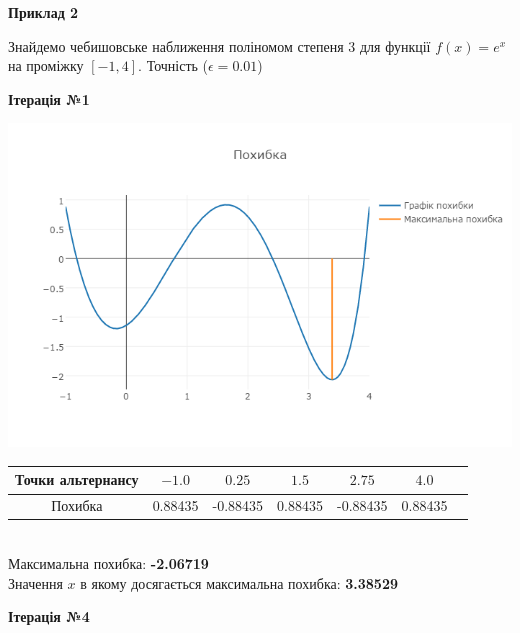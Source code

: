 \documentclass[ukrainian,14pt]{extarticle}
\begin{document}
\newpage


\textbf{Приклад 2} 	

Знайдемо чебишовське наближення поліномом степеня 3 для функції $f(x) = e^{x}$ на проміжку $[-1, 4]$. Точність ($\epsilon = 0.01$)

\begin{center}
\textbf{Ітерація №1}
\end{center}

\includegraphics[scale=0.65]{exp_err1}
\begin{tabular}{|c|c|c|c|c|c|c}
\hline
\rule{0pt}{4ex}
Точки альтернансу & $-1.0$ & $0.25$ & $1.5$ & $2.75$ & $4.0$ \\ \hline
\rule{0pt}{4ex} 
Похибка & 0.88435 & -0.88435 & 0.88435 & -0.88435 & 0.88435  \\ \hline 
\end{tabular}\\

\noindent
Максимальна похибка: \textbf{-2.06719}\\
Значення $x$ в якому досягається максимальна похибка: \textbf{3.38529}


\newpage

\begin{center}
\textbf{Ітерація №4}
\end{center}
\end{document}
